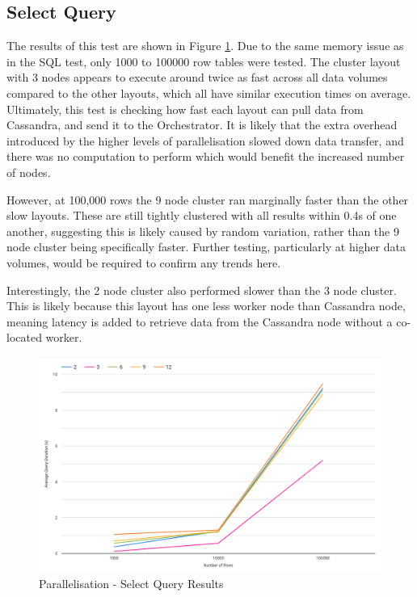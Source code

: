 \subsection{Select Query}
The results of this test are shown in Figure \ref{fig:select-simple-parallelisation-test}. Due to the same memory issue as in the SQL test, only 1000 to 100000 row tables were tested. The cluster layout with 3 nodes appears to execute around twice as fast across all data volumes compared to the other layouts, which all have similar execution times on average. Ultimately, this test is checking how fast each layout can pull data from Cassandra, and send it to the Orchestrator. It is likely that the extra overhead introduced by the higher levels of parallelisation slowed down data transfer, and there was no computation to perform which would benefit the increased number of nodes. 

However, at 100,000 rows the 9 node cluster ran marginally faster than the other slow layouts. These are still tightly clustered with all results within 0.4s of one another, suggesting this is likely caused by random variation, rather than the 9 node cluster being specifically faster. Further testing, particularly at higher data volumes, would be required to confirm any trends here. 

Interestingly, the 2 node cluster also performed slower than the 3 node cluster. This is likely because this layout has one less worker node than Cassandra node, meaning latency is added to retrieve data from the Cassandra node without a co-located worker. 

\begin{figure}[ht]
	\centering
	\includegraphics[width=0.8\linewidth]{chapters/diagrams/testing/select-simple-parallelisation-test}
	\caption{Parallelisation - Select Query Results} 
	\label{fig:select-simple-parallelisation-test}
\end{figure}

